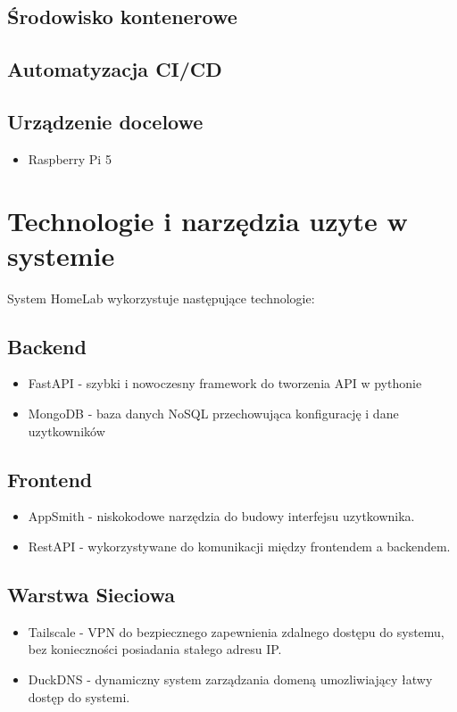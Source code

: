\subsection{Środowisko kontenerowe}

\subsection{Automatyzacja CI/CD}

\subsection{Urządzenie docelowe}

\begin{itemize}
    \item Raspberry Pi 5
\end{itemize}



\section{Technologie i narzędzia uzyte w systemie}

System HomeLab wykorzystuje następujące technologie:
\subsection{Backend}
\begin{itemize}
    \item FastAPI - szybki i nowoczesny framework do tworzenia API w pythonie
    \item MongoDB - baza danych NoSQL przechowująca konfigurację i dane uzytkowników
\end{itemize}
\subsection{Frontend}
\begin{itemize}
    \item AppSmith - niskokodowe narzędzia do budowy interfejsu uzytkownika.
    \item RestAPI - wykorzystywane do komunikacji między frontendem a backendem.
\end{itemize}
\subsection{Warstwa Sieciowa}
\begin{itemize}
    \item Tailscale - VPN do bezpiecznego zapewnienia zdalnego dostępu do systemu, bez konieczności posiadania stałego adresu IP.
    \item DuckDNS - dynamiczny system zarządzania domeną umozliwiający łatwy dostęp do systemi.
\end{itemize}
